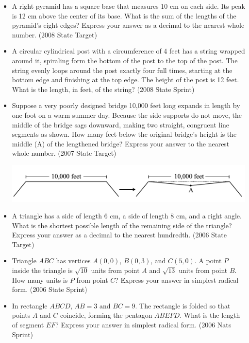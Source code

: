 \documentclass{article}
\begin{document}
\begin{itemize}
\item A right pyramid has a square base that measures 10 cm on each side. Its peak is 12 cm above the center of its base. What is the sum of the lengths of the pyramid's eight edges? Express your answer as a decimal to the nearest whole number. (2008 State Target)

\item A circular cylindrical post with a circumference of 4 feet has a string wrapped around it, spiraling form the bottom of the post to the top of the post. The string evenly loops around the post exactly four full times, starting at the bottom edge and finishing at the top edge. The height of the post is 12 feet. What is the length, in feet, of the string? (2008 State Sprint)

\item Suppose a very poorly designed bridge 10,000 feet long expands in length by one foot on a warm summer day. Because the side supports do not move, the middle of the bridge sags downward, making two straight, congruent line segments as shown. How many feet below the original bridge's height is the middle (A) of the lengthened bridge? Express your answer to the nearest whole number. (2007 State Target)

\centerline{\includegraphics{20072.png}}

\item A triangle has a side of length 6 cm, a side of length 8 cm, and a right angle. What is the shortest possible length of the remaining side of the triangle? Express your answer as a decimal to the nearest hundredth. (2006 State Target)

\item Triangle $ABC$ has vertices $A(0,0)$, $B(0,3)$, and $C(5,0)$. A point $P$ inside the triangle is $\sqrt{10}$ units from point $A$ and $\sqrt{13}$ units from point $B$. How many units is $P$ from point $C$? Express your answer in simplest radical form. (2006 State Sprint)

\item In rectangle $ABCD$, $AB=3$ and $BC=9$. The rectangle is folded so that points $A$ and $C$ coincide, forming the pentagon $ABEFD$. What is the length of segment $EF$? Express your answer in simplest radical form. (2006 Nats Sprint)


\end{itemize}
\end{document}
